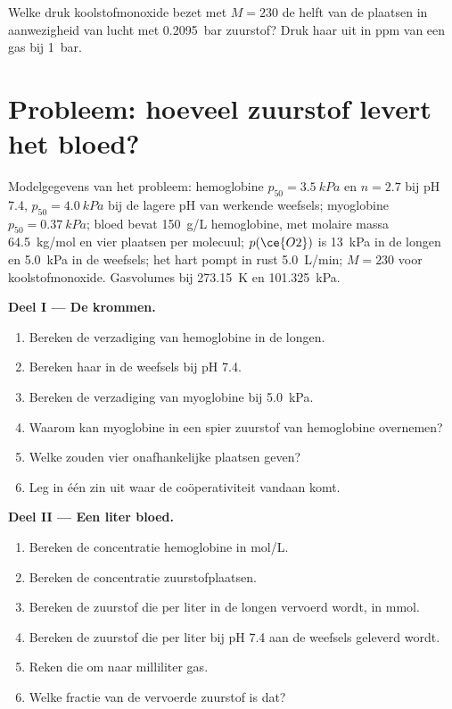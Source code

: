 \begin{exercise}[$\star\star\star$]\label{exo:b3:bioinorganic:12}
Welke druk koolstofmonoxide bezet met $M = 230$ de helft van de plaatsen
in aanwezigheid van lucht met \qty{0.2095}{bar} zuurstof? Druk haar uit in ppm van een gas bij \qty{1}{bar}.
\end{exercise}

\section{Probleem: hoeveel zuurstof levert het bloed?}

\begin{problem}
\label{pb:b3:bioinorganic:1}
Modelgegevens van het probleem: hemoglobine $p_{50} = \qty{3.5}{kPa}$ en $n = 2.7$ bij pH 7.4, $p_{50} = \qty{4.0}{kPa}$ bij de
lagere pH van werkende weefsels; myoglobine $p_{50} = \qty{0.37}{kPa}$; bloed bevat \qty{150}{g/L}
hemoglobine, met molaire massa \qty{64.5}{kg/mol} en vier plaatsen per molecuul; $p(\ce{O2})$ is \qty{13}{kPa}
in de longen en \qty{5.0}{kPa} in de weefsels; het hart pompt in rust \qty{5.0}{L/min};
$M = 230$ voor koolstofmonoxide. Gasvolumes bij \qty{273.15}{K} en \qty{101.325}{kPa}.

\medskip\noindent\textbf{Deel I --- De krommen.}
\begin{enumerate}
  \item Bereken de verzadiging van hemoglobine in de longen.
  \item Bereken haar in de weefsels bij pH 7.4.
  \item Bereken de verzadiging van myoglobine bij \qty{5.0}{kPa}.
  \item Waarom kan myoglobine in een spier zuurstof van hemoglobine
        overnemen?
  \item Welke  zouden vier onafhankelijke plaatsen geven?
  \item Leg in één zin uit waar de coöperativiteit vandaan komt.
\end{enumerate}

\medskip\noindent\textbf{Deel II --- Een liter bloed.}
\begin{enumerate}[resume]
  \item Bereken de concentratie hemoglobine in mol/L.
  \item Bereken de concentratie zuurstofplaatsen.
  \item Bereken de zuurstof die per liter in de longen vervoerd wordt, in
        mmol.
  \item Bereken de zuurstof die per liter bij pH 7.4 aan de weefsels
        geleverd wordt.
  \item Reken die om naar milliliter gas.
  \item Welke fractie van de vervoerde zuurstof is dat?
\end{enumerate}


\end{problem}
